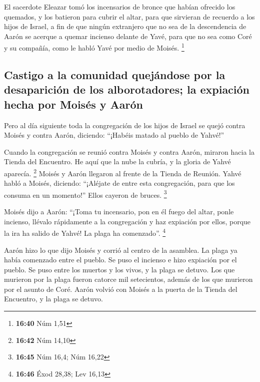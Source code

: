 \begin{paracol}{2}
 El sacerdote Eleazar tomó los incensarios de bronce que
habían ofrecido los quemados, y los batieron para cubrir el altar,
 para que sirvieran de recuerdo a los hijos de Israel, a
fin de que ningún extranjero que no sea de la descendencia de Aarón se
acerque a quemar incienso delante de Yavé, para que no sea como Coré y
su compañía, como le habló Yavé por medio de Moisés. \footnote{\textbf{16:40}
  Núm 1,51}

\hypertarget{castigo-a-la-comunidad-quejuxe1ndose-por-la-desapariciuxf3n-de-los-alborotadores-la-expiaciuxf3n-hecha-por-moisuxe9s-y-aaruxf3n}{%
\subsection{Castigo a la comunidad quejándose por la desaparición de los
alborotadores; la expiación hecha por Moisés y
Aarón}\label{castigo-a-la-comunidad-quejuxe1ndose-por-la-desapariciuxf3n-de-los-alborotadores-la-expiaciuxf3n-hecha-por-moisuxe9s-y-aaruxf3n}}

 Pero al día siguiente toda la congregación de los hijos
de Israel se quejó contra Moisés y contra Aarón, diciendo: ``¡Habéis
matado al pueblo de Yahvé!''

 Cuando la congregación se reunió contra Moisés y contra
Aarón, miraron hacia la Tienda del Encuentro. He aquí que la nube la
cubría, y la gloria de Yahvé aparecía. \footnote{\textbf{16:42} Núm
  14,10}  Moisés y Aarón llegaron al frente de la Tienda
de Reunión.  Yahvé habló a Moisés, diciendo:
 ``¡Aléjate de entre esta congregación, para que los
consuma en un momento!'' Ellos cayeron de bruces. \footnote{\textbf{16:45}
  Núm 16,4; Núm 16,22}

 Moisés dijo a Aarón: ``¡Toma tu incensario, pon en él
fuego del altar, ponle incienso, llévalo rápidamente a la congregación y
haz expiación por ellos, porque la ira ha salido de Yahvé! La plaga ha
comenzado''. \footnote{\textbf{16:46} Éxod 28,38; Lev 16,13}

 Aarón hizo lo que dijo Moisés y corrió al centro de la
asamblea. La plaga ya había comenzado entre el pueblo. Se puso el
incienso e hizo expiación por el pueblo.  Se puso entre
los muertos y los vivos, y la plaga se detuvo.  Los que
murieron por la plaga fueron catorce mil setecientos, además de los que
murieron por el asunto de Coré.  Aarón volvió con Moisés
a la puerta de la Tienda del Encuentro, y la plaga se detuvo.


\end{paracol}
